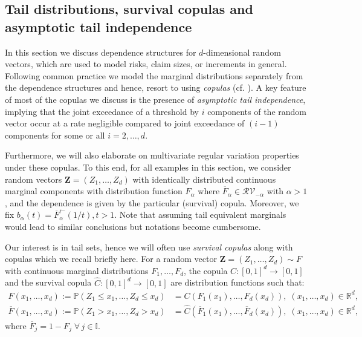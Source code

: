 \documentclass[aos]{imsart}
\numberwithin{equation}{section}
\theoremstyle{plain} %
\theoremstyle{remark}
\renewcommand\P{\mathbb{P}}
\newcommand{\R}{\mathbb{R}}
\def\RV{\mathcal{RV}}
\def\bZ{\boldsymbol Z}
\begin{document}
\subsection{Tail distributions, survival copulas and asymptotic tail independence} \label{subsec:copasymind}
In this section we discuss dependence structures for $d$-dimensional random vectors, which are used to model risks, claim sizes, or increments in general. Following common practice we model the marginal distributions separately from the dependence structures and hence, resort to using \emph{copulas} (cf. \citep{joe:1997,nelsen:1999}). A key feature of most of the copulas we discuss is the presence of \emph{asymptotic tail independence},  implying  that the joint exceedance of a threshold by $i$ components of the random vector occur at a rate negligible compared to joint exceedance of $(i-1)$ components for some or all $i=2,\ldots, d$.

Furthermore, we will also elaborate on  multivariate regular variation properties under these copulas. To this end, for all examples in this section, we consider random vectors $\bZ=(Z_1,\ldots,Z_d)$ with identically distributed continuous marginal components with distribution function $F_{\alpha}$ where $\overline{F}_{\alpha}\in \RV_{-\alpha}$ with $\alpha>1$, and the dependence is given by the particular (survival) copula. Moreover, we fix $b_{\alpha}(t)=\overline{F}_{\alpha}^{\leftarrow}(1/t), t>1$. Note that assuming tail equivalent marginals would lead to similar conclusions but notations become cumbersome.

 Our interest  is in tail sets, hence we will often use \emph{survival copulas} along with copulas which we recall briefly here. For a random vector $\bZ=(Z_1,\ldots, Z_d)\sim F$ with  continuous marginal distributions $F_1,\ldots, F_d$, the copula $C:[0,1]^d \to [0,1]$ and the survival copula $\widehat{C}:[0,1]^d \to [0,1]$ are {distribution functions} such that:
\begin{align*}
    F(x_1,\ldots,x_d):=\P(Z_1\le x_1,\ldots, Z_d \le x_d) & = C(F_1(x_1), \ldots, F_d(x_d)), \; (x_1,\ldots,x_d) \in \R^d,\\
   \overline{F}(x_1,\ldots,x_d):= \P(Z_1 > x_1,\ldots, Z_d > x_d) & = \widehat{C}(\overline{F}_1(x_1), \ldots, \overline{F}_d(x_d)), \; (x_1,\ldots,x_d) \in \R^d,
\end{align*}
where $\overline{F}_j=1-F_j\; \forall\, j\in\mathbb{I}.$
\end{document}
